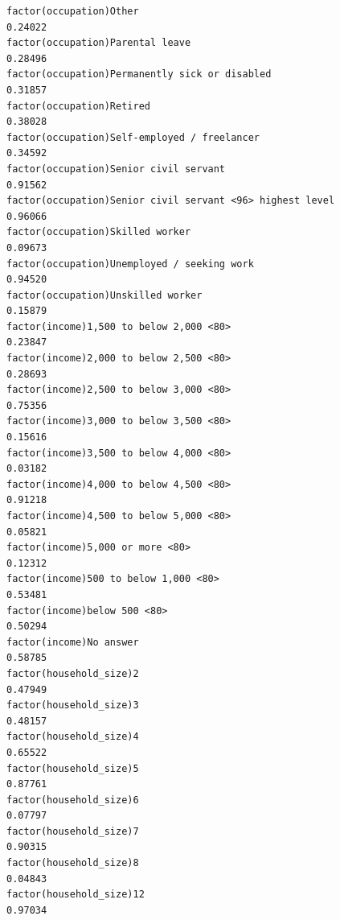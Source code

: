 \documentclass[
]{article}
\begin{document}
\begin{table}
\begin{minipage}[t]{\linewidth}
{\begin{verbatim}
factor(occupation)Other                                                            0.24022
factor(occupation)Parental leave                                                   0.28496
factor(occupation)Permanently sick or disabled                                     0.31857
factor(occupation)Retired                                                          0.38028
factor(occupation)Self-employed / freelancer                                       0.34592
factor(occupation)Senior civil servant                                             0.91562
factor(occupation)Senior civil servant <96> highest level                          0.96066
factor(occupation)Skilled worker                                                   0.09673
factor(occupation)Unemployed / seeking work                                        0.94520
factor(occupation)Unskilled worker                                                 0.15879
factor(income)1,500 to below 2,000 <80>                                            0.23847
factor(income)2,000 to below 2,500 <80>                                            0.28693
factor(income)2,500 to below 3,000 <80>                                            0.75356
factor(income)3,000 to below 3,500 <80>                                            0.15616
factor(income)3,500 to below 4,000 <80>                                            0.03182
factor(income)4,000 to below 4,500 <80>                                            0.91218
factor(income)4,500 to below 5,000 <80>                                            0.05821
factor(income)5,000 or more <80>                                                   0.12312
factor(income)500 to below 1,000 <80>                                              0.53481
factor(income)below 500 <80>                                                       0.50294
factor(income)No answer                                                            0.58785
factor(household_size)2                                                            0.47949
factor(household_size)3                                                            0.48157
factor(household_size)4                                                            0.65522
factor(household_size)5                                                            0.87761
factor(household_size)6                                                            0.07797
factor(household_size)7                                                            0.90315
factor(household_size)8                                                            0.04843
factor(household_size)12                                                           0.97034

\end{verbatim}}
\end{minipage}
\end{table}
\end{document}
